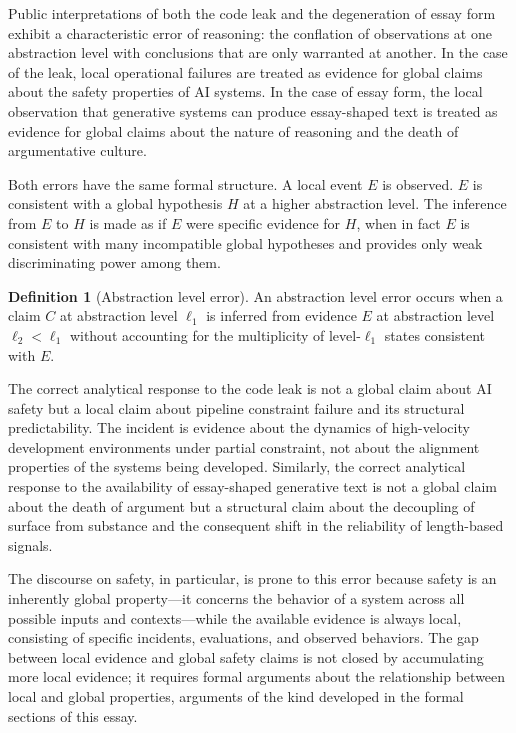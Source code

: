 \documentclass[12pt, oneside]{article}
\theoremstyle{plain}
\theoremstyle{definition}
\newtheorem{definition}[theorem]{Definition}
\theoremstyle{remark}
\begin{document}
Public interpretations of both the code leak and the degeneration of essay form exhibit a
characteristic error of reasoning: the conflation of observations at one abstraction level
with conclusions that are only warranted at another. In the case of the leak, local
operational failures are treated as evidence for global claims about the safety properties
of AI systems. In the case of essay form, the local observation that generative systems
can produce essay-shaped text is treated as evidence for global claims about the nature of
reasoning and the death of argumentative culture.

Both errors have the same formal structure. A local event $E$ is observed. $E$ is
consistent with a global hypothesis $H$ at a higher abstraction level. The inference from
$E$ to $H$ is made as if $E$ were specific evidence for $H$, when in fact $E$ is consistent
with many incompatible global hypotheses and provides only weak discriminating power among
them.

\begin{definition}[Abstraction level error]
An abstraction level error occurs when a claim $C$ at abstraction level $\ell_1$ is
inferred from evidence $E$ at abstraction level $\ell_2 < \ell_1$ without accounting for
the multiplicity of level-$\ell_1$ states consistent with $E$.
\end{definition}

The correct analytical response to the code leak is not a global claim about AI safety but
a local claim about pipeline constraint failure and its structural predictability. The
incident is evidence about the dynamics of high-velocity development environments under
partial constraint, not about the alignment properties of the systems being developed.
Similarly, the correct analytical response to the availability of essay-shaped generative
text is not a global claim about the death of argument but a structural claim about the
decoupling of surface from substance and the consequent shift in the reliability of
length-based signals.

The discourse on safety, in particular, is prone to this error because safety is an
inherently global property---it concerns the behavior of a system across all possible
inputs and contexts---while the available evidence is always local, consisting of specific
incidents, evaluations, and observed behaviors. The gap between local evidence and global
safety claims is not closed by accumulating more local evidence; it requires formal arguments
about the relationship between local and global properties, arguments of the kind developed
in the formal sections of this essay.
\end{document}

